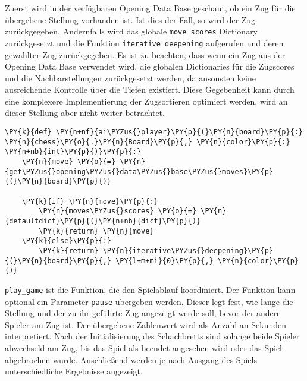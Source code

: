 Zuerst wird in der verfügbaren Opening Data Base geschaut, ob ein Zug
für die übergebene Stellung vorhanden ist. Ist dies der Fall, so wird
der Zug zurückgegeben. Andernfalls wird das globale
\texttt{move\_scores} Dictionary zurückgesetzt und die Funktion
\texttt{iterative\_deepening} aufgerufen und deren gewählter Zug
zurückgegeben. Es ist zu beachten, dass wenn ein Zug aus der Opening
Data Base verwendet wird, die globalen Dictionaries für die Zugscores
und die Nachbarstellungen zurückgesetzt werden, da ansonsten keine
ausreichende Kontrolle über die Tiefen existiert. Diese Gegebenheit kann
durch eine komplexere Implementierung der Zugsortieren optimiert werden,
wird an dieser Stellung aber nicht weiter betrachtet.

\bigskip

    \begin{tcolorbox}[fontupper=\linespread{.66}\selectfont, breakable, size=fbox, boxrule=1pt, pad at break*=1mm,colback=cellbackground, colframe=cellborder]
\begin{Verbatim}[commandchars=\\\{\}]
\PY{k}{def} \PY{n+nf}{ai\PYZus{}player}\PY{p}{(}\PY{n}{board}\PY{p}{:} \PY{n}{chess}\PY{o}{.}\PY{n}{Board}\PY{p}{,} \PY{n}{color}\PY{p}{:} \PY{n+nb}{int}\PY{p}{)}\PY{p}{:}
    \PY{n}{move} \PY{o}{=} \PY{n}{get\PYZus{}opening\PYZus{}data\PYZus{}base\PYZus{}moves}\PY{p}{(}\PY{n}{board}\PY{p}{)}
    
    \PY{k}{if} \PY{n}{move}\PY{p}{:}
        \PY{n}{moves\PYZus{}scores} \PY{o}{=} \PY{n}{defaultdict}\PY{p}{(}\PY{n+nb}{dict}\PY{p}{)}
        \PY{k}{return} \PY{n}{move}
    \PY{k}{else}\PY{p}{:}
        \PY{k}{return} \PY{n}{iterative\PYZus{}deepening}\PY{p}{(}\PY{n}{board}\PY{p}{,} \PY{l+m+mi}{0}\PY{p}{,} \PY{n}{color}\PY{p}{)}
\end{Verbatim}
\end{tcolorbox}

    \texttt{play\_game} ist die Funktion, die den Spielablauf koordiniert.
Der Funktion kann optional ein Parameter \texttt{pause} übergeben
werden. Dieser legt fest, wie lange die Stellung und der zu ihr geführte
Zug angezeigt werde soll, bevor der andere Spieler am Zug ist. Der
übergebene Zahlenwert wird als Anzahl an Sekunden interpretiert. Nach
der Initialisierung des Schachbretts sind solange beide Spieler
abwechseld am Zug, bis das Spiel als beendet angesehen wird oder das
Spiel abgebrochen wurde. Anschließend werden je nach Ausgang des Spiels
unterschiedliche Ergebnisse angezeigt.

